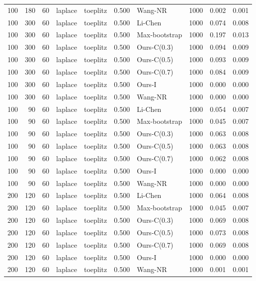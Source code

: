 \begin{tabular}{rrrllrlrrr}
100 & 180 & 60 & laplace & toeplitz & 0.500 & Wang-NR & 1000 & 0.002 & 0.001 \\
100 & 300 & 60 & laplace & toeplitz & 0.500 & Li-Chen & 1000 & 0.074 & 0.008 \\
100 & 300 & 60 & laplace & toeplitz & 0.500 & Max-bootstrap & 1000 & 0.197 & 0.013 \\
100 & 300 & 60 & laplace & toeplitz & 0.500 & Ours-C(0.3) & 1000 & 0.094 & 0.009 \\
100 & 300 & 60 & laplace & toeplitz & 0.500 & Ours-C(0.5) & 1000 & 0.093 & 0.009 \\
100 & 300 & 60 & laplace & toeplitz & 0.500 & Ours-C(0.7) & 1000 & 0.084 & 0.009 \\
100 & 300 & 60 & laplace & toeplitz & 0.500 & Ours-I & 1000 & 0.000 & 0.000 \\
100 & 300 & 60 & laplace & toeplitz & 0.500 & Wang-NR & 1000 & 0.000 & 0.000 \\
100 & 90 & 60 & laplace & toeplitz & 0.500 & Li-Chen & 1000 & 0.054 & 0.007 \\
100 & 90 & 60 & laplace & toeplitz & 0.500 & Max-bootstrap & 1000 & 0.045 & 0.007 \\
100 & 90 & 60 & laplace & toeplitz & 0.500 & Ours-C(0.3) & 1000 & 0.063 & 0.008 \\
100 & 90 & 60 & laplace & toeplitz & 0.500 & Ours-C(0.5) & 1000 & 0.063 & 0.008 \\
100 & 90 & 60 & laplace & toeplitz & 0.500 & Ours-C(0.7) & 1000 & 0.062 & 0.008 \\
100 & 90 & 60 & laplace & toeplitz & 0.500 & Ours-I & 1000 & 0.000 & 0.000 \\
100 & 90 & 60 & laplace & toeplitz & 0.500 & Wang-NR & 1000 & 0.000 & 0.000 \\
200 & 120 & 60 & laplace & toeplitz & 0.500 & Li-Chen & 1000 & 0.064 & 0.008 \\
200 & 120 & 60 & laplace & toeplitz & 0.500 & Max-bootstrap & 1000 & 0.045 & 0.007 \\
200 & 120 & 60 & laplace & toeplitz & 0.500 & Ours-C(0.3) & 1000 & 0.069 & 0.008 \\
200 & 120 & 60 & laplace & toeplitz & 0.500 & Ours-C(0.5) & 1000 & 0.073 & 0.008 \\
200 & 120 & 60 & laplace & toeplitz & 0.500 & Ours-C(0.7) & 1000 & 0.069 & 0.008 \\
200 & 120 & 60 & laplace & toeplitz & 0.500 & Ours-I & 1000 & 0.000 & 0.000 \\
200 & 120 & 60 & laplace & toeplitz & 0.500 & Wang-NR & 1000 & 0.001 & 0.001 \\

\end{tabular}
